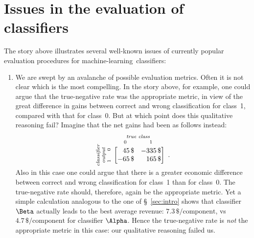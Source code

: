 \documentclass[\ifafour a4paper,12pt,\else a5paper,10pt,\fi%
onecolumn,oneside,article,%
british%
]{memoir}
\theoremstyle{remark}
\theoremstyle{innote}
\renewcommand*{\|}[1][]{\nonscript\:#1\vert\nonscript\:\mathopen{}}
\newcommand*{\sect}{\S}%
\renewcommand*{\texteuro}{\$}
\newcommand*{\ml}{machine-learning}
\newcommand*{\umatrix}[4]{\begin{bmatrix*}[r]#1&#2\\#3&#4\end{bmatrix*}}
\begin{document}


\section{Issues in the evaluation of classifiers}
\label{sec:issues}


The story above illustrates several well-known issues of currently popular evaluation procedures for \ml\ classifiers:
\begin{enumerate}%
\item We are swept by an avalanche of possible evaluation metrics. Often it is not clear which is the most compelling. In the story above, for example, one could argue that the true-negative rate was the appropriate metric, in view of the great difference in gains between correct and wrong classification for class~1, compared with that for class~0.
But at which point does this qualitative reasoning fail? Imagine that the net gains had been as follows instead:
\begin{equation}
  \label{eq:utility_example_2}
  \rotatebox[origin=c]{90}{
    \clap{\textit{\parbox{5em}{\centering\scriptsize classifier\\output\\$1\hspace{1.5em}0$}}
    }}\ 
  \overbracket[0pt]{
    \umatrix{
        45\,\text{\texteuro} }{ -335\,\text{\texteuro} }{
        -65\,\text{\texteuro} }{ 165\,\text{\texteuro}
      }}^{
      \clap{\textit{\parbox{6em}{\centering\scriptsize true class\\$0\hspace{4em}1$}}
    }} \ .
\end{equation}
Also in this case one could argue that there is a greater economic difference between correct and wrong classification for class~1 than for class~0. The true-negative rate should, therefore, again be the appropriate metric. Yet a simple calculation analogous to the one of \sect~\ref{sec:intro} shows that classifier~$\Beta$ actually leads to the best average revenue: $7.3\,\text{\texteuro/component}$, vs $4.7\,\text{\texteuro/component}$ for classifier $\Alpha$. Hence the true-negative rate is \emph{not} the appropriate metric in this case: our qualitative reasoning failed us.



\end{enumerate}
\end{document}
